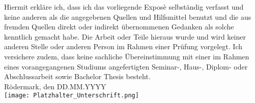 Hiermit erkläre ich, dass ich das vorliegende Exposè selbständig verfasst und keine anderen als die angegebenen Quellen und Hilfsmittel benutzt und die aus fremden Quellen direkt oder indirekt übernommenen Gedanken als solche kenntlich gemacht habe. Die Arbeit oder Teile hieraus wurde und wird keiner anderen Stelle oder anderen Person im Rahmen einer Prüfung vorgelegt. Ich versichere zudem, dass keine sachliche Übereinstimmung mit einer im Rahmen eines vorangegangenen Studiums angefertigten Seminar-, Haus-, Diplom- oder Abschlussarbeit sowie Bachelor Thesis besteht.
\\ [1.2em]
Rödermark, den DD.MM.YYYY%
\\ [1.2em]
\texttt{[image: Platzhalter\_Unterschrift.png]}%